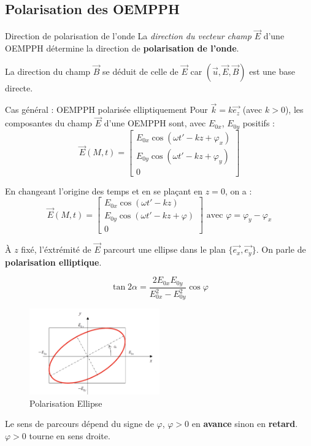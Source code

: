 \subsection{Polarisation des OEMPPH}
\begin{Definition}[colbacktitle=red!75!black]{Direction de polarisation de l'onde}{}
La \textit{direction du vecteur champ} $\overrightarrow{E} $ d'une OEMPPH détermine la direction de \textbf{polarisation de l'onde}.

La direction du champ $\overrightarrow{B} $ se déduit de celle de $\overrightarrow{E} $ car $(\overrightarrow{u} , \overrightarrow{E} ,\overrightarrow{B} )$ est une base directe.
\end{Definition}

\begin{Prop}{Cas général : OEMPPH polarisée elliptiquement}{}
Pour $\overrightarrow{k} = k\overrightarrow{e_z}$ (avec $k>0$), les composantes du champ $\overrightarrow{E} $ d'une OEMPPH sont, avec $E_{0x}$, $E_{0y}$ positifs :
\[
    \overrightarrow{E} (M,t) = \begin{bmatrix} E_{0x}\cos ( \omega t'- kz + \varphi_x) \\E_{0y}\cos ( \omega t'- kz + \varphi_y)\\ 0 \end{bmatrix} 
\]

En changeant l'origine des temps et en se plaçant en $z=0$, on a :
\[
    \overrightarrow{E} (M,t) = \begin{bmatrix} E_{0x}\cos ( \omega t'- kz ) \\E_{0y}\cos ( \omega t'- kz + \varphi)\\ 0 \end{bmatrix} \text{ avec } \varphi = \varphi_y - \varphi_x
\]


À $z$ fixé, l'éxtrémité de $\overrightarrow{E}$ parcourt une ellipse dans le plan $\{\overrightarrow{e_x} , \overrightarrow{e_y} \}$. On parle de \textbf{polarisation elliptique}.

\[
\tan 2 \alpha  = \frac{2E_{0x}E_{0y}}{E_{0x}^{2} - E_{0y}^{2}} \cos \varphi 
\]

\begin{figure}[H] %
    \centering
    \includegraphics[width=0.5\textwidth]{./assets/Polarisation Ellipse.png}
    \caption{Polarisation Ellipse}
    \label{fig:Polarisation-Ellipse}
\end{figure}
Le sens de parcours dépend du signe de $\varphi$,  $\varphi>0$ en  \textbf{avance} sinon en \textbf{retard}. $\varphi >0$ tourne en sens droite.



\end{Prop}

